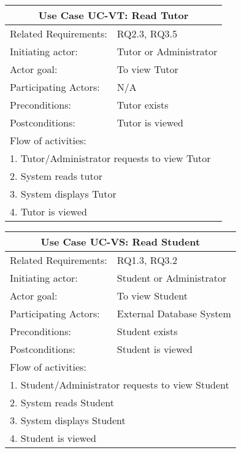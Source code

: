 \documentclass[12pt]{article}
\begin{document}
{		
		\begin{tabular}{| l | p{10cm}| }
			\hline\multicolumn{2}{|c|}{ \textbf{Use Case UC-VT: Read Tutor}} \\ \hline
			Related Requirements: & RQ2.3, RQ3.5 \\ \hline
			Initiating actor: & Tutor or Administrator \\ \hline
			Actor goal: & To view Tutor\\ \hline
			Participating Actors: & N/A\\ \hline
			Preconditions:& Tutor exists\\ \hline
			Postconditions: & Tutor is viewed\\ \hline
			\multicolumn{2}{|l|}{Flow of activities:}\\ \hline
			\multicolumn{2}{|p{15cm}|}{1. Tutor/Administrator requests to view Tutor}\\
			\multicolumn{2}{|p{15cm}|}{2. System reads tutor}\\
			\multicolumn{2}{|p{15cm}|}{3. System displays Tutor}\\
			\multicolumn{2}{|l|}{4. Tutor is viewed}	
			\\ \hline		
		\end{tabular}	



		
		\begin{tabular}{| l | p{10cm}| }
			\hline\multicolumn{2}{|c|}{ \textbf{Use Case UC-VS: Read Student}} \\ \hline
			Related Requirements: & RQ1.3, RQ3.2 \\ \hline
			Initiating actor: & Student or Administrator \\ \hline
			Actor goal: & To view Student\\ \hline
			Participating Actors: & External Database System\\ \hline
			Preconditions: &Student exists\\ \hline
			Postconditions: & Student is viewed\\ \hline
			\multicolumn{2}{|l|}{Flow of activities:}\\ \hline
			\multicolumn{2}{|p{15cm}|}{1. Student/Administrator requests to view Student}\\
			\multicolumn{2}{|p{15cm}|}{2. System reads Student}\\ 
			\multicolumn{2}{|p{15cm}|}{3. System displays Student}\\
			\multicolumn{2}{|l|}{4. Student is viewed}	
			\\ \hline		
		\end{tabular}
		
}
\end{document}
